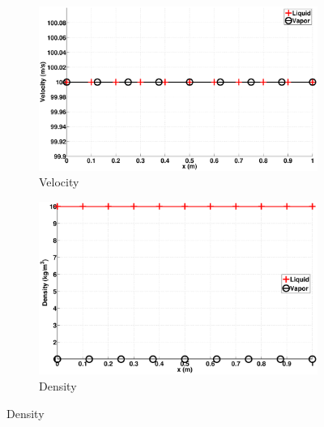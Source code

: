 \documentclass[preprint,10pt]{elsarticle}
\begin{document}
\begin{figure}[H]
        \centering
        \begin{subfigure}[b]{0.495\textwidth}
                \centering
                \includegraphics[width=\textwidth]{figures/vf-shock_two_phases_velocity.eps}
                \caption{Velocity}
                \label{fig:adv-vf-vel}
        \end{subfigure}%
        \begin{subfigure}[b]{0.495\textwidth}
                \centering
                \includegraphics[width=\textwidth]{figures/vf-shock_two_phases_temperature.eps}
                \caption{Density}
                \label{fig:adv-vf-density}
        \end{subfigure}
        

\end{figure}
\end{document}
